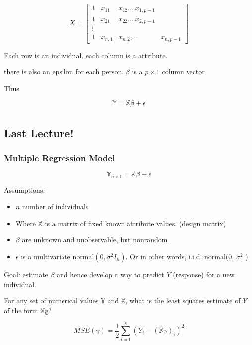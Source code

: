 \documentclass{report}
\begin{document}
\[
X = \begin{bmatrix}
	1 &x_{11} & x_{12}. \dots x_{1, p-1}\\
	1 &x_{21} &x_{22}. \dots x_{2, p-1}\\
	\vdots \\
	1 &x_{n,1} &x_{n, 2}, \dots & x_{n, p-1}
\end{bmatrix}
\]

Each row is an individual, each column is a attribute. 


there is also an epsilon for each person. $\beta$ is a $p \times 1$ column vector

Thus 

\[
	\mathbb{Y} = \mathbb{X}\beta + \epsilon
\]



\chapter{}
\section{Last Lecture!}

\subsection{Multiple Regression Model}



\[
	\mathbb{Y}_{n \times 1} = \mathbb{X\beta} + \mathbb{\epsilon}
\]

Assumptions: 
\begin{itemize}
	\item $n$ number of individuals
	\item Where $\mathbb{X}$  is a matrix of fixed known attribute values.   (design matrix)
	\item $\beta$ are unknown and unobservable, but nonrandom
	\item $\epsilon$ is a multivariate normal$(0, \sigma^{2} I_{n})$. Or in other words, i.i.d. normal(0, $\sigma^{2}$ )
\end{itemize}

Goal: estimate $\beta$ and hence develop a way to predict $Y$ (response) for a new individual.


For any set of numerical values $\mathbb{Y}$ and $\mathbb{X}$, what is the least squares estimate of $Y$ of the form $\mathbb{X\gamma}$?

\[
	MSE(\gamma) =\frac{1}{2} \sum_{i=1}^{n} (Y_{i} - (\mathbb{X}\gamma)_{i})^{2}
\]
\end{document}
